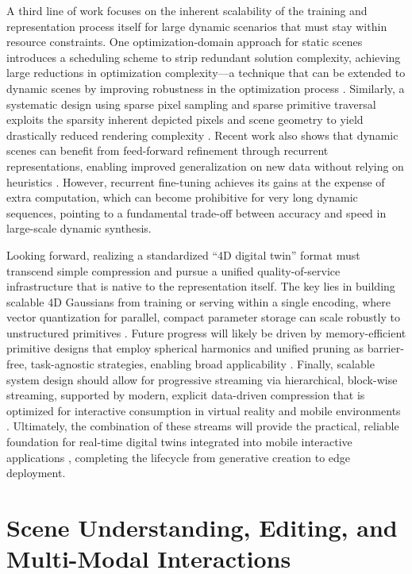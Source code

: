 \documentclass[11pt,a4paper]{article}
\begin{document}
A third line of work focuses on the inherent scalability of the training and representation process itself for large dynamic scenarios that must stay within resource constraints. One optimization-domain approach for static scenes introduces a scheduling scheme to strip redundant solution complexity, achieving large reductions in optimization complexity---a technique that can be extended to dynamic scenes by improving robustness in the optimization process \cite{arxiv:2503.18402v2}. Similarly, a systematic design using sparse pixel sampling and sparse primitive traversal exploits the sparsity inherent depicted pixels and scene geometry to yield drastically reduced rendering complexity \cite{arxiv:2412.00578v3}. Recent work also shows that dynamic scenes can benefit from feed-forward refinement through recurrent representations, enabling improved generalization on new data without relying on heuristics \cite{arxiv:2510.08575v3}. However, recurrent fine-tuning achieves its gains at the expense of extra computation, which can become prohibitive for very long dynamic sequences, pointing to a fundamental trade-off between accuracy and speed in large-scale dynamic synthesis.

Looking forward, realizing a standardized ``4D digital twin'' format must transcend simple compression and pursue a unified quality-of-service infrastructure that is native to the representation itself. The key lies in building scalable 4D Gaussians from training or serving within a single encoding, where vector quantization for parallel, compact parameter storage can scale robustly to unstructured primitives \cite{arxiv:2311.18159v3}. Future progress will likely be driven by memory-efficient primitive designs that employ spherical harmonics and unified pruning as barrier-free, task-agnostic strategies, enabling broad applicability \cite{arxiv:2509.07021v3}. Finally, scalable system design should allow for progressive streaming via hierarchical, block-wise streaming, supported by modern, explicit data-driven compression that is optimized for interactive consumption in virtual reality and mobile environments \cite{arxiv:2505.10144v1}. Ultimately, the combination of these streams will provide the practical, reliable foundation for real-time digital twins integrated into mobile interactive applications \cite{arxiv:2603.11531v1}, completing the lifecycle from generative creation to edge deployment.


\section{Scene Understanding, Editing, and Multi-Modal Interactions}
\end{document}
